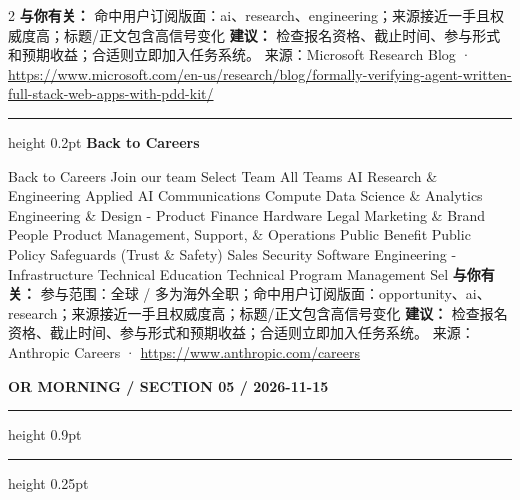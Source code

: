 \documentclass[10.5pt]{ctexart}
\begin{document}
\begin{multicols}{2}
\textbf{与你有关：} 命中用户订阅版面：ai、research、engineering；来源接近一手且权威度高；标题/正文包含高信号变化
\textbf{建议：} 检查报名资格、截止时间、参与形式和预期收益；合适则立即加入任务系统。
{\footnotesize\color{ormuted} 来源：Microsoft Research Blog · \url{https://www.microsoft.com/en-us/research/blog/formally-verifying-agent-written-full-stack-web-apps-with-pdd-kit/}}
\vspace{2mm}
\hrule height 0.2pt
\vspace{2mm}
{\large\bfseries Back to Careers}\par
Back to Careers Join our team Select Team All Teams AI Research \& Engineering Applied AI Communications Compute Data Science \& Analytics Engineering \& Design - Product Finance Hardware Legal Marketing \& Brand People Product Management, Support, \& Operations Public Benefit Public Policy Safeguards (Trust \& Safety) Sales Security Software Engineering - Infrastructure Technical Education Technical Program Management Sel
\textbf{与你有关：} 参与范围：全球 / 多为海外全职；命中用户订阅版面：opportunity、ai、research；来源接近一手且权威度高；标题/正文包含高信号变化
\textbf{建议：} 检查报名资格、截止时间、参与形式和预期收益；合适则立即加入任务系统。
{\footnotesize\color{ormuted} 来源：Anthropic Careers · \url{https://www.anthropic.com/careers}}
\end{multicols}
\newpage
{\small\bfseries OR MORNING / SECTION 05 / 2026-11-15}
\vspace{2mm}
\hrule height 0.9pt
\vspace{1.5mm}
\hrule height 0.25pt
\vspace{4mm}
\end{document}

